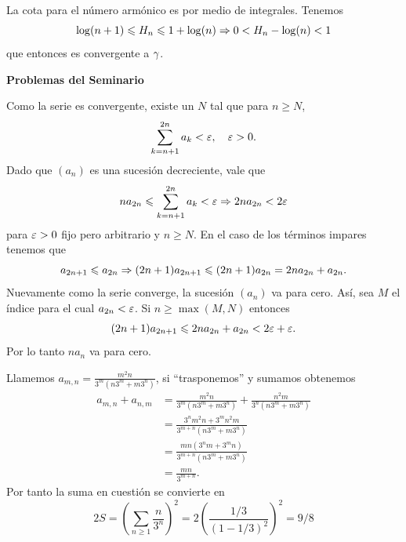 \documentclass[12pt]{memoir}
\begin{document}
\begin{Ex}
    La cota para el número armónico es por medio de integrales. Tenemos 
    \[
    \log(n+1)\leqslant H_n\leqslant 1+\log(n)\Rightarrow 0< H_n-\log(n)<1
    \]
    que entonces es convergente a \(\gamma\).
\end{Ex}
\newpage

\textbf{Problemas del Seminario}
\setcounter{Ej}{0}

\begin{Ej}
    Como la serie es convergente, existe un \(N\) tal que para \(n\geq N\),
    \[
    \sum_{k=n+1}^{2n}a_k<\varepsilon,\quad \varepsilon>0.
    \]
    Dado que \((a_n)\) es una sucesión decreciente, vale que 
    \[
    na_{2n}\leqslant \sum_{k=n+1}^{2n}a_k<\varepsilon\Rightarrow 2na_{2n}<2\varepsilon
    \]
    para \(\varepsilon>0\) fijo pero arbitrario y \(n\geq N\). En el caso de los términos impares tenemos que 
    \[
    a_{2n+1}\leqslant a_{2n}\Rightarrow (2n+1)a_{2n+1}\leqslant (2n+1)a_{2n}=2na_{2n}+a_{2n}.
    \]
    Nuevamente como la serie converge, la sucesión \((a_n)\) va para cero. Así, sea \(M\) el índice para el cual \(a_{2n}<\varepsilon\). Si \(n\geq \max(M,N)\) entonces
    \[
    (2n+1)a_{2n+1}\leqslant 2na_{2n}+a_{2n}<2\varepsilon+\varepsilon.
    \]
    Por lo tanto \(na_n\) va para cero.
\end{Ej}

\begin{Ej}
    Llamemos \(a_{m,n}=\frac{m^2n}{3^m(n3^m+m3^n)}\), si ``trasponemos'' y sumamos obtenemos 
    \begin{align*}
        a_{m,n}+a_{n,m}&=\frac{m^2n}{3^m(n3^m+m3^n)}+\frac{n^2m}{3^n(n3^m+m3^n)}\\
        &=\frac{3^nm^2n+3^mn^2m}{3^{m+n}(n3^m+m3^n)}\\
        &=\frac{mn(3^nm+3^mn)}{3^{m+n}(n3^m+m3^n)}\\
        &=\frac{mn}{3^{m+n}}.
    \end{align*}
    Por tanto la suma en cuestión se convierte en 
    \[
    2S=\left(\sum_{n\geq 1}\frac{n}{3^n}\right)^2=2\left(\frac{1/3}{(1-1/3)^2}\right)^2=9/8
    \]
\end{Ej}
\end{document}
